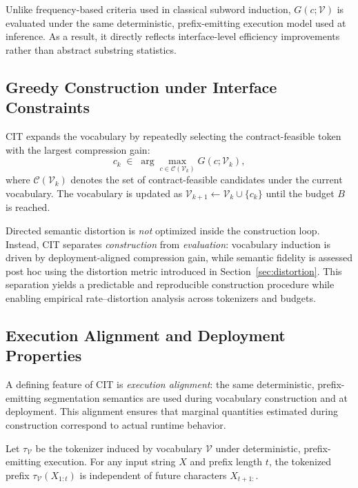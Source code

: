 Unlike frequency-based criteria used in classical subword induction, $G(c;\mathcal{V})$ is evaluated under the same deterministic, prefix-emitting execution model used at inference.
As a result, it directly reflects interface-level efficiency improvements rather than abstract substring statistics.

\subsection{Greedy Construction under Interface Constraints}
\label{sec:greedy}

CIT expands the vocabulary by repeatedly selecting the contract-feasible token with the largest compression gain:
\begin{equation}
c_k
\;\in\;
\arg\max_{c \in \mathcal{C}(\mathcal{V}_k)}
G(c;\mathcal{V}_k),
\label{eq:greedy}
\end{equation}
where $\mathcal{C}(\mathcal{V}_k)$ denotes the set of contract-feasible candidates under the current vocabulary.
The vocabulary is updated as $\mathcal{V}_{k+1} \leftarrow \mathcal{V}_k \cup \{c_k\}$ until the budget $B$ is reached.

Directed semantic distortion is \emph{not} optimized inside the construction loop.
Instead, CIT separates \emph{construction} from \emph{evaluation}: vocabulary induction is driven by deployment-aligned compression gain, while semantic fidelity is assessed post hoc using the distortion metric introduced in Section~\ref{sec:distortion}.
This separation yields a predictable and reproducible construction procedure while enabling empirical rate--distortion analysis across tokenizers and budgets.

\subsection{Execution Alignment and Deployment Properties}
\label{sec:properties}

A defining feature of CIT is \emph{execution alignment}: the same deterministic, prefix-emitting segmentation semantics are used during vocabulary construction and at deployment.
This alignment ensures that marginal quantities estimated during construction correspond to actual runtime behavior.

\begin{lemma}
\label{lem:prefix}
Let $\tau_{\mathcal{V}}$ be the tokenizer induced by vocabulary $\mathcal{V}$ under deterministic, prefix-emitting execution.
For any input string $X$ and prefix length $t$, the tokenized prefix $\tau_{\mathcal{V}}(X_{1:t})$ is independent of future characters $X_{t+1:}$.
\end{lemma}

